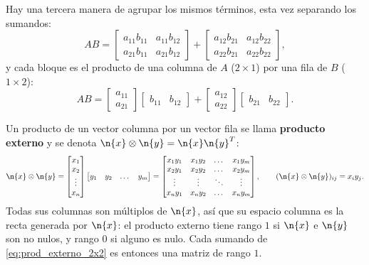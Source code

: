 Hay una tercera manera de agrupar los mismos términos, esta vez separando los
sumandos:
\[
AB =
\begin{bmatrix}
a_{11}b_{11} & a_{11}b_{12} \\
a_{21}b_{11} & a_{21}b_{12}
\end{bmatrix}
+
\begin{bmatrix}
a_{12}b_{21} & a_{12}b_{22} \\
a_{22}b_{21} & a_{22}b_{22}
\end{bmatrix},
\]
y cada bloque es el producto de una columna de $A$ ($2 \times 1$) por una fila
de $B$ ($1 \times 2$):
\begin{equation}
AB =
\begin{bmatrix} a_{11} \\ a_{21} \end{bmatrix}
\begin{bmatrix} b_{11} & b_{12} \end{bmatrix}
+
\begin{bmatrix} a_{12} \\ a_{22} \end{bmatrix}
\begin{bmatrix} b_{21} & b_{22} \end{bmatrix}.
\label{eq:prod_externo_2x2}
\end{equation}

Un producto de un vector columna por un vector fila se llama \textbf{producto
externo} y se denota $\n{x}\otimes\n{y} = \n{x}\n{y}^T$:
\begin{equation}\label{prod:externo}
\n{x}\otimes \n{y}=
\begin{bmatrix} x_1 \\ x_2 \\ \vdots \\ x_n \end{bmatrix}
\begin{bmatrix} y_1 & y_2 & \dots & y_m \end{bmatrix}
=
\begin{bmatrix}
x_1 y_1 & x_1 y_2 & \dots & x_1 y_m \\
x_2 y_1 & x_2 y_2 & \dots & x_2 y_m \\
\vdots & \vdots & \ddots & \vdots \\
x_n y_1 & x_n y_2 & \dots & x_n y_m
\end{bmatrix},
\qquad
(\n{x} \otimes \n{y})_{ij} = x_i y_j .
\end{equation}
Todas sus columnas son múltiplos de $\n{x}$, así que su espacio columna es la
recta generada por $\n{x}$: el producto externo tiene rango $1$ si $\n{x}$ e
$\n{y}$ son no nulos, y rango $0$ si alguno es nulo. Cada sumando de
\eqref{eq:prod_externo_2x2} es entonces una matriz de rango $1$.

